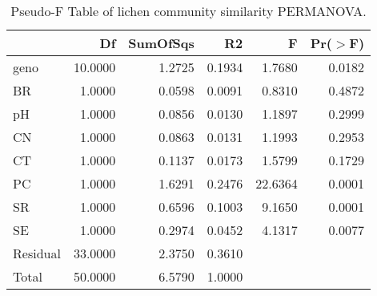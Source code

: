 \begin{table}[ht]
\centering
\begin{tabular}{lrrrrr}
  \hline
 & Df & SumOfSqs & R2 & F & Pr($>$F) \\ 
  \hline
geno & 10.0000 & 1.2725 & 0.1934 & 1.7680 & 0.0182 \\ 
  BR & 1.0000 & 0.0598 & 0.0091 & 0.8310 & 0.4872 \\ 
  pH & 1.0000 & 0.0856 & 0.0130 & 1.1897 & 0.2999 \\ 
  CN & 1.0000 & 0.0863 & 0.0131 & 1.1993 & 0.2953 \\ 
  CT & 1.0000 & 0.1137 & 0.0173 & 1.5799 & 0.1729 \\ 
  PC & 1.0000 & 1.6291 & 0.2476 & 22.6364 & 0.0001 \\ 
  SR & 1.0000 & 0.6596 & 0.1003 & 9.1650 & 0.0001 \\ 
  SE & 1.0000 & 0.2974 & 0.0452 & 4.1317 & 0.0077 \\ 
  Residual & 33.0000 & 2.3750 & 0.3610 &  &  \\ 
  Total & 50.0000 & 6.5790 & 1.0000 &  &  \\ 
   \hline
\end{tabular}
\caption{Pseudo-F Table of lichen community similarity PERMANOVA.} 
\label{tab:com_perm}
\end{table}
